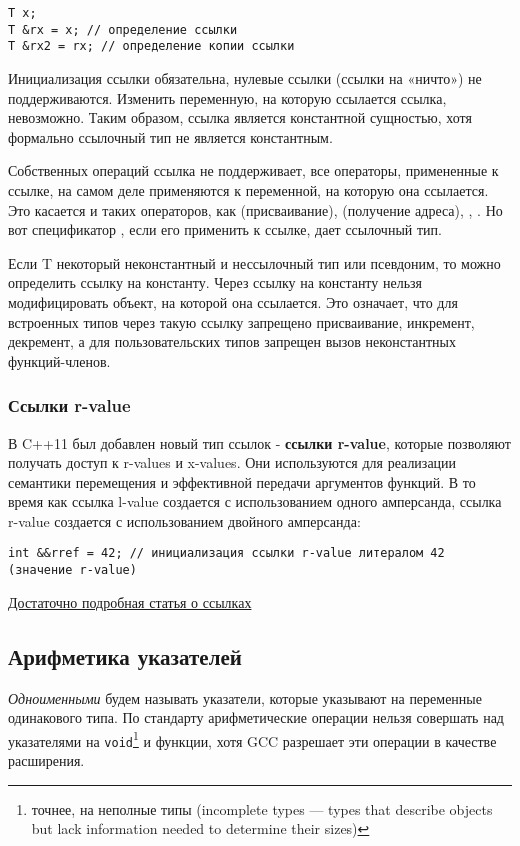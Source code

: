 \begin{verbatim}
T x;
T &rx = x; // определение ссылки
T &rx2 = rx; // определение копии ссылки
\end{verbatim}

Инициализация ссылки обязательна, нулевые ссылки (ссылки на «ничто») не поддерживаются. Изменить переменную, на которую ссылается ссылка, невозможно. Таким образом, ссылка является константной сущностью, хотя формально ссылочный тип не является константным.

Собственных операций ссылка не поддерживает, все операторы, примененные к ссылке, на самом деле применяются к переменной, на которую она ссылается. Это касается и таких операторов, как \mverb{=} (присваивание), \mverb{&} (получение адреса), , . Но вот спецификатор , если его применить к ссылке, дает ссылочный тип.

Если T некоторый неконстантный и нессылочный тип или псевдоним, то можно определить ссылку на константу. Через ссылку на константу нельзя модифицировать объект, на которой она ссылается. Это означает, что для встроенных типов через такую ссылку запрещено присваивание, инкремент, декремент, а для пользовательских типов запрещен вызов неконстантных функций-членов.

\subsubsection*{Ссылки r-value}

В C++11 был добавлен новый тип ссылок - \textbf{ссылки r-value}, которые позволяют получать доступ к r-values и x-values. Они используются для реализации семантики перемещения и эффективной передачи аргументов функций. В то время как ссылка l-value создается с использованием одного амперсанда, ссылка r-value создается с использованием двойного амперсанда:

\begin{verbatim}
int &&rref = 42; // инициализация ссылки r-value литералом 42 (значение r-value)
\end{verbatim}

\href{https://habr.com/ru/articles/646005/}{Достаточно подробная статья о ссылках}

\subsection{Арифметика указателей}
\textit{Одноименными} будем называть указатели, которые указывают на переменные
одинакового типа. По стандарту арифметические операции нельзя совершать над 
указателями на \verb|void|\footnote{точнее, на неполные типы (incomplete types ---
types that describe objects but lack information needed to determine their sizes)}
и функции, хотя GCC разрешает эти операции в качестве расширения.

